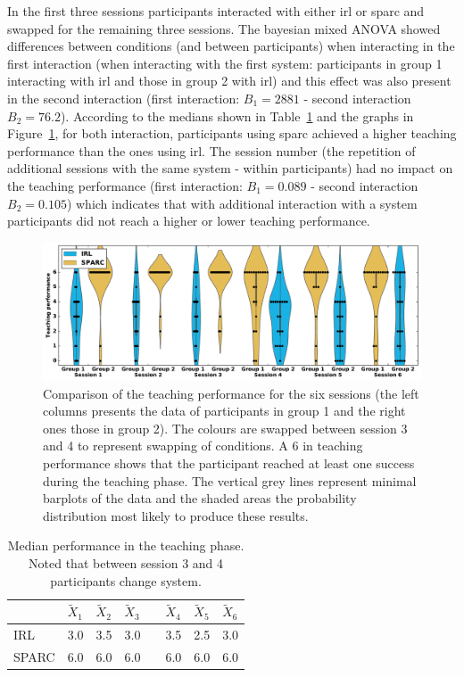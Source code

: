 In the first three sessions participants interacted with either \gls{irl} or \gls{sparc} and swapped for the remaining three sessions. The bayesian mixed ANOVA showed differences between conditions (and between participants) when interacting in the first interaction (when interacting with the first system: participants in group 1 interacting with \gls{irl} and those in group 2 with \gls{irl}) and this effect was also present in the second interaction (first interaction: $B_1=2881$ - second interaction $B_2 = 76.2$). According to the medians shown in Table~\ref{tab:control_teaching_perf} and the graphs in Figure~\ref{fig:control_teaching_performance}, for both interaction, participants using \gls{sparc} achieved a higher teaching performance than the ones using \gls{irl}. The session number (the repetition of additional sessions with the same system - within participants) had no impact on the teaching performance (first interaction: $B_1=0.089$ - second interaction $B_2=0.105$) which indicates that with additional interaction with a system participants did not reach a higher or lower teaching performance.

\begin{figure}[ht]
	\includegraphics[width=\textwidth]{teaching_performance.pdf}
	\centering
	\caption{Comparison of the teaching performance for the six sessions (the left columns presents the data of participants in group 1 and the right ones those in group 2). The colours are swapped between session 3 and 4 to represent swapping of conditions. A 6 in teaching performance shows that the participant reached at least one success during the teaching phase. The vertical grey lines represent minimal barplots of the data and the shaded areas the probability distribution most likely to produce these results.
	}
	\label{fig:control_teaching_performance}
\end{figure}

\begin{table}[ht]
	\centering
	\caption{Median performance in the teaching phase. Noted that between session 3 and 4 participants change system.}
	\label{tab:control_teaching_perf}
	\begin{tabular}{@{}llllllll@{}}\toprule
		& $\widetilde{X}_{1}$ & $\widetilde{X}_{2}$ & $\widetilde{X}_{3}$& & $\widetilde{X}_{4}$ & $\widetilde{X}_{5}$ & $\widetilde{X}_{6}$\\ 
		\midrule
		IRL & 3.0 & 3.5 & 3.0 & \crossarr & 3.5 & 2.5 & 3.0\\
		SPARC & 6.0 & 6.0 & 6.0 && 6.0 & 6.0 & 6.0\\
		\bottomrule
	\end{tabular}
\end{table}

